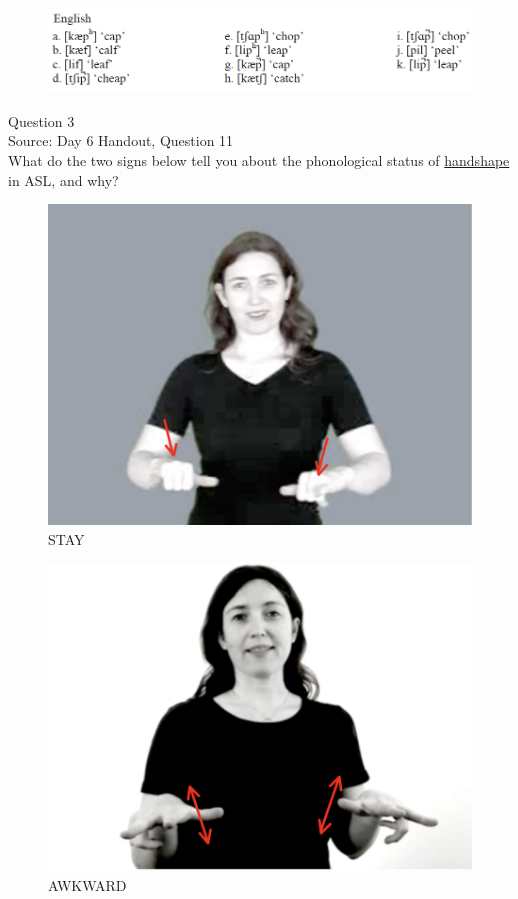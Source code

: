 \documentclass[12pt]{article}
\begin{document}
\begin{figure}[H]
\includegraphics{../images/english_labials.png}
\end{figure}

\newpage

{\large Question 3}\\

Source: Day 6 Handout, Question 11\\

What do the two signs below tell you about the phonological status of \underline{handshape} in ASL, and why?\\

\begin{figure}[H]
\includegraphics{../images/asl_stay.png}
\caption{STAY}
\end{figure}
\begin{figure}[H]
\includegraphics{../images/asl_awkward.png}
\caption{AWKWARD}
\end{figure}
\end{document}
